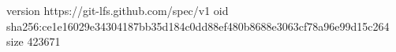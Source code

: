 version https://git-lfs.github.com/spec/v1
oid sha256:ce1e16029e34304187bb35d184c0dd88ef480b8688e3063cf78a96e99d15c264
size 423671

